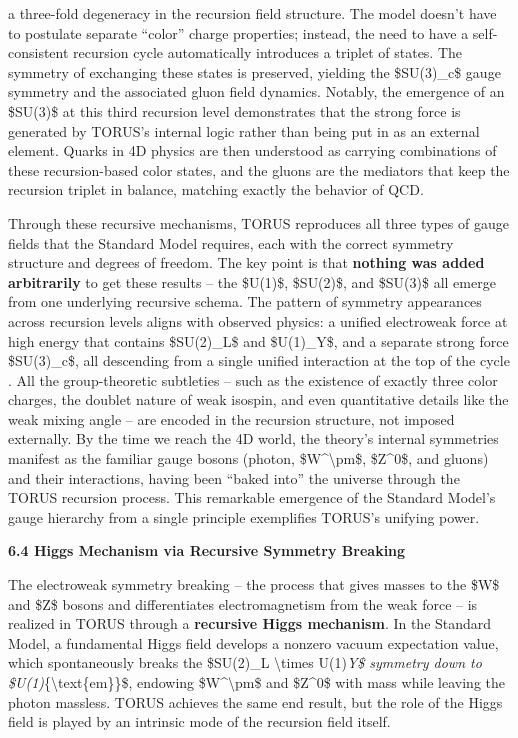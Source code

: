 \documentclass[]{article}
\begin{document}
\begin{itemize}
  a three-fold degeneracy in the recursion field structure​. The model
  doesn't have to postulate separate ``color'' charge properties;
  instead, the need to have a self-consistent recursion cycle
  automatically introduces a triplet of states. The symmetry of
  exchanging these states is preserved, yielding the \$SU(3)\_c\$ gauge
  symmetry and the associated gluon field dynamics​. Notably, the
  emergence of an \$SU(3)\$ at this third recursion level demonstrates
  that the strong force is generated by TORUS's internal logic rather
  than being put in as an external element​. Quarks in 4D physics are
  then understood as carrying combinations of these recursion-based
  color states, and the gluons are the mediators that keep the recursion
  triplet in balance, matching exactly the behavior of QCD.
\end{itemize}

Through these recursive mechanisms, TORUS reproduces all three types of
gauge fields that the Standard Model requires, each with the correct
symmetry structure and degrees of freedom. The key point is that
\textbf{nothing was added arbitrarily} to get these results -- the
\$U(1)\$, \$SU(2)\$, and \$SU(3)\$ all emerge from one underlying
recursive schema. The pattern of symmetry appearances across recursion
levels aligns with observed physics: a unified electroweak force at high
energy that contains \$SU(2)\_L\$ and \$U(1)\_Y\$, and a separate strong
force \$SU(3)\_c\$, all descending from a single unified interaction at
the top of the cycle​. All the group-theoretic subtleties -- such as the
existence of exactly three color charges, the doublet nature of weak
isospin, and even quantitative details like the weak mixing angle -- are
encoded in the recursion structure, not imposed externally​. By the time
we reach the 4D world, the theory's internal symmetries manifest as the
familiar gauge bosons (photon, \$W\^{}\textbackslash{}pm\$, \$Z\^{}0\$,
and gluons) and their interactions, having been ``baked into'' the
universe through the TORUS recursion process. This remarkable emergence
of the Standard Model's gauge hierarchy from a single principle
exemplifies TORUS's unifying power.

\textbf{6.4 Higgs Mechanism via Recursive Symmetry Breaking}

The electroweak symmetry breaking -- the process that gives masses to
the \$W\$ and \$Z\$ bosons and differentiates electromagnetism from the
weak force -- is realized in TORUS through a \textbf{recursive Higgs
mechanism}. In the Standard Model, a fundamental Higgs field develops a
nonzero vacuum expectation value, which spontaneously breaks the
\$SU(2)\_L \textbackslash{}times U(1)\emph{Y\$ symmetry down to
\$U(1)}\{\textbackslash{}text\{em\}\}\$, endowing
\$W\^{}\textbackslash{}pm\$ and \$Z\^{}0\$ with mass while leaving the
photon massless. TORUS achieves the same end result, but the role of the
Higgs field is played by an intrinsic mode of the recursion field
itself.
\end{document}
